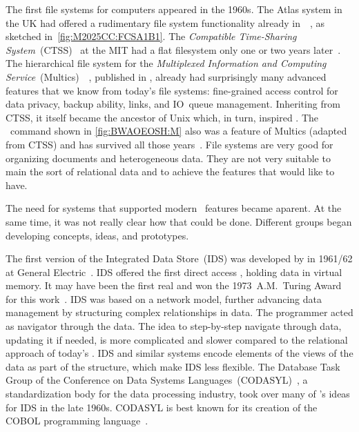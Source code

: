The first file systems for computers appeared in the 1960s.
The Atlas system in the UK had offered a rudimentary file system functionality already in~\citeyear{KPH1961TAS}~\cite{KPH1961TAS,M2025CC:FCSA1B1}, as sketched in~\cref{fig:M2025CC:FCSA1B1}.
The  \emph{Compatible Time-Sharing System}~(CTSS)~\cite{CMDDCHOK1963TCTSSAPG} at the MIT had a flat filesystem only one or two years later~\cite{OD1963TCCSLABTCDE}.
The hierarchical file system for the \emph{Multiplexed Information and Computing Service}~(Multics)~~\cite{CV1965IAOOTMS,BWAOEOSH:M}, published in \citeyear{DN1965AGPFSFSS}, already had surprisingly many advanced features that we know from today's file systems: fine-grained access control for data privacy, backup ability, links, and IO~queue management.
Inheriting from CTSS, it itself became the ancestor of Unix which, in turn, inspired \linux.
The ~command shown in \cref{fig:BWAOEOSH:M} also was a feature of Multics (adapted from CTSS) and has survived all those years~\cite{F1999ABHOTLC}.
File systems are very good for organizing documents and heterogeneous data.
They are not very suitable to main the sort of relational data and to achieve the features that would like  to have.

The need for systems that supported modern \db\ features became aparent.
At the same time, it was not really clear how that could be done.
Different groups began developing concepts, ideas, and prototypes.

The first version of the Integrated Data Store~(IDS) was developed by \citeauthor{B2009TOOTIDSITFDAD} in 1961/62 at General Electric~\cite{B2009TOOTIDSITFDAD,B1965SFRAP}.
IDS offered the first direct access , holding data in virtual memory.
It may have been the first real  and \citeauthor{B2009TOOTIDSITFDAD} won the 1973~A.M.~Turing Award for this work~\cite{H2016HCBITDAFOODW}.
IDS was based on a network model, further advancing data management by structuring complex relationships in data.
The programmer acted as navigator through the data.
The idea to step-by-step navigate through data, updating it if needed, is more complicated and slower compared to the relational approach of today's .
IDS and similar systems encode elements of the views of the data as part of the  structure, which make IDS less flexible.
The Database Task Group of the Conference on Data Systems Languages~(CODASYL)~\cite{TF1976CDBMS}, a standardization body for the data processing industry, took over many of \citeauthor{B2009TOOTIDSITFDAD}'s ideas for IDS in the late 1960s.
CODASYL is best known for its creation of the COBOL programming language~\cite{H2016HCBITDAFOODW}.

